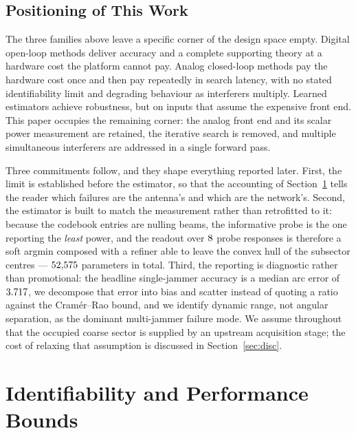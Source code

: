 \documentclass[journal]{IEEEtran}
\begin{document}
\subsection{Positioning of This Work}
\label{sec:lit:position}

The three families above leave a specific corner of the design space empty.
Digital open-loop methods deliver accuracy and a complete supporting theory at
a hardware cost the platform cannot pay. Analog closed-loop methods pay the
hardware cost once and then pay repeatedly in search latency, with no stated
identifiability limit and degrading behaviour as interferers multiply. Learned
estimators achieve robustness, but on inputs that assume the expensive front
end. This paper occupies the remaining corner: the analog front end and its
scalar power measurement are retained, the iterative search is removed, and
multiple simultaneous interferers are addressed in a single forward pass.

Three commitments follow, and they shape everything reported later. First, the
limit is established before the estimator, so that the accounting of
Section~\ref{sec:bounds} tells the reader which failures are the antenna's and
which are the network's. Second, the estimator is built to match the
measurement rather than retrofitted to it: because the codebook entries are
nulling beams, the informative probe is the one reporting the \emph{least}
power, and the readout over $8$ probe responses is therefore a soft
argmin composed with a refiner able to leave the convex hull of the subsector
centres --- $52{,}575$ parameters in total. Third, the reporting is
diagnostic rather than promotional: the headline single-jammer accuracy is a
median arc error of $3.717$, we decompose that error into bias and
scatter instead of quoting a ratio against the Cram\'er--Rao bound, and we
identify dynamic range, not angular separation, as the dominant multi-jammer
failure mode. We assume throughout that the occupied coarse sector is supplied
by an upstream acquisition stage; the cost of relaxing that assumption is
discussed in Section~\ref{sec:disc}.

\section{Identifiability and Performance Bounds}
\label{sec:bounds}
\end{document}
